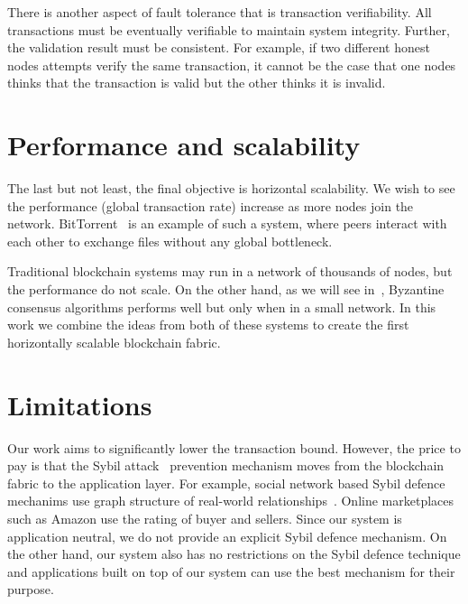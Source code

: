 There is another aspect of fault tolerance that is transaction verifiability.
All transactions must be eventually verifiable to maintain system integrity.
Further, the validation result must be consistent.
For example, if two different honest nodes attempts verify the same transaction,
it cannot be the case that one nodes thinks that the transaction is valid but the other thinks it is invalid.


\section{Performance and scalability}

The last but not least, the final objective is horizontal scalability.
We wish to see the performance (global transaction rate) increase as more nodes join the network.
BitTorrent~\cite{cohen2003incentives} is an example of such a system,
where peers interact with each other to exchange files without any global bottleneck.

Traditional blockchain systems may run in a network of thousands of nodes, but the performance do not scale.
On the other hand, as we will see in~, Byzantine consensus algorithms performs well but only when in a small network.
In this work we combine the ideas from both of these systems to create the first horizontally scalable blockchain fabric.

\section{Limitations}
Our work aims to significantly lower the transaction bound.
However, the price to pay is that the Sybil attack~\cite{douceur2002sybil} prevention mechanism moves from the blockchain fabric to the application layer.
For example, social network based Sybil defence mechanims use graph structure of real-world relationships~\cite{yu2006sybilguard}.
Online marketplaces such as Amazon use the rating of buyer and sellers.
Since our system is application neutral, we do not provide an explicit Sybil defence mechanism.
On the other hand, our system also has no restrictions on the Sybil defence technique
and applications built on top of our system can use the best mechanism for their purpose.


